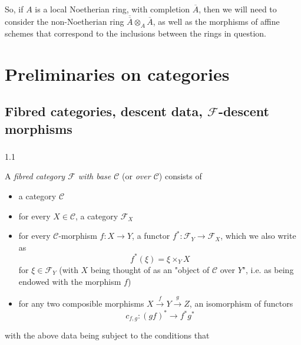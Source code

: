   So, if \(A\) is a local Noetherian ring, with completion \(\overline {A}\), then we will need to consider the non-Noetherian ring \(\overline {\overline {A}}\otimes _A\overline {A}\), as well as the morphisms of affine schemes that correspond to the inclusions between the rings in question.\chapter{Preliminaries on categories}\thispagestyle{fancy}\label{fga3.i-a}\section{Fibred categories, descent data, \(\mathcal {F}\)-descent morphisms}\label{fga3.i-a.1}\subsection{}\label{fga3.i-a.1.a}\begin{definition}{1.1}\label{fga3.i-a.1-definition-1.1}\skipsinglepar\par{}A \emph{fibred category \(\mathcal {F}\) with base \(\mathcal {C}\)} (or \emph{over \(\mathcal {C}\)}) consists of

    \begin{itemize}\item{}a category \(\mathcal {C}\)

      \item{}for every \(X\in \mathcal {C}\), a category \(\mathcal {F}_X\)

      \item{}for every \(\mathcal {C}\)-morphism \(f\colon  X\to  Y\), a functor \(f^*\colon \mathcal {F}_Y\to \mathcal {F}_X\), which we also write as
        \[           f^*(\xi ) = \xi  \times _Y X         \]
        for \(\xi \in \mathcal {F}_Y\) (with \(X\) being thought of as an "object of \(\mathcal {C}\) over \(Y\)", i.e. as being endowed with the morphism \(f\))

      \item{}for any two composible morphisms \(X\xrightarrow {f}Y\xrightarrow {g}Z\), an isomorphism of functors
        \[           c_{f,g}\colon  (gf)^* \to  f^*g^*         \]\end{itemize}

    with the above data being subject to the conditions that

    
 \begin{enumerate}
      

\end{enumerate}
\end{definition}
